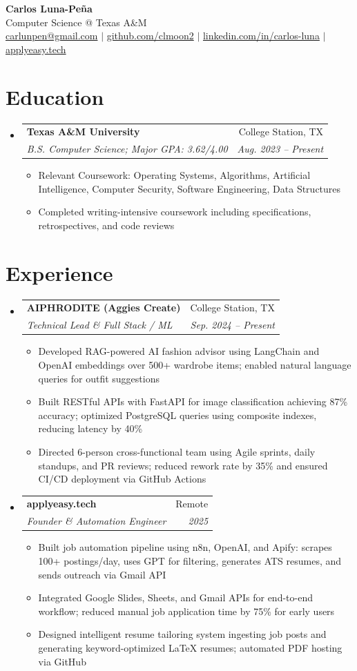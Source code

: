 \documentclass[letterpaper,11pt]{article}
\makeatletter
\newcommand{\resumeItem}[1]{
  \item\small{{#1 \vspace{-2pt}}}
}
\newcommand{\resumeSubheading}[4]{
  \vspace{-2pt}\item
    \begin{tabular*}{0.97\textwidth}[t]{l@{\extracolsep{\fill}}r}
      \textbf{#1} & #2 \\
      \textit{\small#3} & \textit{\small #4} \\
    \end{tabular*}\vspace{-7pt}
}
\newcommand{\resumeSubHeadingListStart}{\begin{itemize}[leftmargin=0.15in, label={}]}
\newcommand{\resumeSubHeadingListEnd}{\end{itemize}}
\newcommand{\resumeItemListStart}{\begin{itemize}}
\newcommand{\resumeItemListEnd}{\end{itemize}\vspace{-5pt}}
\makeatother
\begin{document}
\begin{center}
  \textbf{\Huge Carlos Luna-Peña} \\ \vspace{1pt}
  Computer Science @ Texas A\&M \\ \vspace{1pt}
  \href{mailto:carlunpen@gmail.com}{carlunpen@gmail.com} $|$ 
  \href{https://github.com/clmoon2}{github.com/clmoon2} $|$ 
  \href{https://linkedin.com/in/carlos-luna}{linkedin.com/in/carlos-luna} $|$ 
  \href{https://applyeasy.tech}{applyeasy.tech}
\end{center}

\section{Education}
\resumeSubHeadingListStart
  \resumeSubheading
    {Texas A\&M University}{College Station, TX}
    {B.S. Computer Science; Major GPA: 3.62/4.00}{Aug. 2023 -- Present}
    \resumeItemListStart
      \resumeItem{Relevant Coursework: Operating Systems, Algorithms, Artificial Intelligence, Computer Security, Software Engineering, Data Structures}
      \resumeItem{Completed writing-intensive coursework including specifications, retrospectives, and code reviews}
    \resumeItemListEnd
\resumeSubHeadingListEnd

\section{Experience}
\resumeSubHeadingListStart
  \resumeSubheading
    {AIPHRODITE (Aggies Create)}{College Station, TX}
    {Technical Lead \& Full Stack / ML}{Sep. 2024 -- Present}
    \resumeItemListStart
      \resumeItem{Developed RAG-powered AI fashion advisor using LangChain and OpenAI embeddings over 500+ wardrobe items; enabled natural language queries for outfit suggestions}
      \resumeItem{Built RESTful APIs with FastAPI for image classification achieving 87\% accuracy; optimized PostgreSQL queries using composite indexes, reducing latency by 40\%}
      \resumeItem{Directed 6-person cross-functional team using Agile sprints, daily standups, and PR reviews; reduced rework rate by 35\% and ensured CI/CD deployment via GitHub Actions}
    \resumeItemListEnd

  \resumeSubheading
    {applyeasy.tech}{Remote}
    {Founder \& Automation Engineer}{2025}
    \resumeItemListStart
      \resumeItem{Built job automation pipeline using n8n, OpenAI, and Apify: scrapes 100+ postings/day, uses GPT for filtering, generates ATS resumes, and sends outreach via Gmail API}
      \resumeItem{Integrated Google Slides, Sheets, and Gmail APIs for end-to-end workflow; reduced manual job application time by 75\% for early users}
      \resumeItem{Designed intelligent resume tailoring system ingesting job posts and generating keyword-optimized LaTeX resumes; automated PDF hosting via GitHub}
    \resumeItemListEnd
\resumeSubHeadingListEnd
\end{document}
